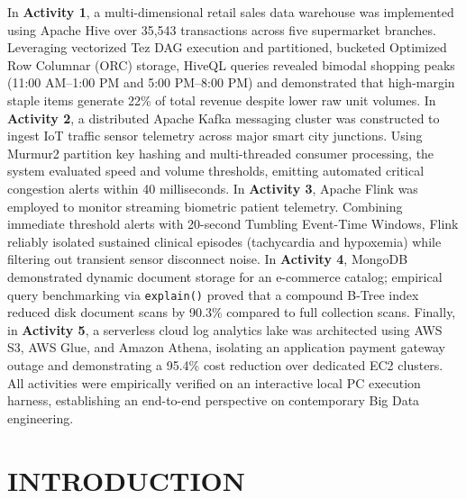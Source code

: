 \documentclass[12pt,a4paper]{report}
\begin{document}
In \textbf{Activity 1}, a multi-dimensional retail sales data warehouse was implemented using Apache Hive over 35,543 transactions across five supermarket branches. Leveraging vectorized Tez DAG execution and partitioned, bucketed Optimized Row Columnar (ORC) storage, HiveQL queries revealed bimodal shopping peaks (11:00 AM--1:00 PM and 5:00 PM--8:00 PM) and demonstrated that high-margin staple items generate 22\% of total revenue despite lower raw unit volumes. In \textbf{Activity 2}, a distributed Apache Kafka messaging cluster was constructed to ingest IoT traffic sensor telemetry across major smart city junctions. Using Murmur2 partition key hashing and multi-threaded consumer processing, the system evaluated speed and volume thresholds, emitting automated critical congestion alerts within 40 milliseconds. In \textbf{Activity 3}, Apache Flink was employed to monitor streaming biometric patient telemetry. Combining immediate threshold alerts with 20-second Tumbling Event-Time Windows, Flink reliably isolated sustained clinical episodes (tachycardia and hypoxemia) while filtering out transient sensor disconnect noise. In \textbf{Activity 4}, MongoDB demonstrated dynamic document storage for an e-commerce catalog; empirical query benchmarking via \texttt{explain()} proved that a compound B-Tree index reduced disk document scans by 90.3\% compared to full collection scans. Finally, in \textbf{Activity 5}, a serverless cloud log analytics lake was architected using AWS S3, AWS Glue, and Amazon Athena, isolating an application payment gateway outage and demonstrating a 95.4\% cost reduction over dedicated EC2 clusters. All activities were empirically verified on an interactive local PC execution harness, establishing an end-to-end perspective on contemporary Big Data engineering.

\clearpage

\tableofcontents
\clearpage
\listoffigures
{}
\clearpage
\listoftables
{}
\clearpage


\chapter{INTRODUCTION}
\end{document}
